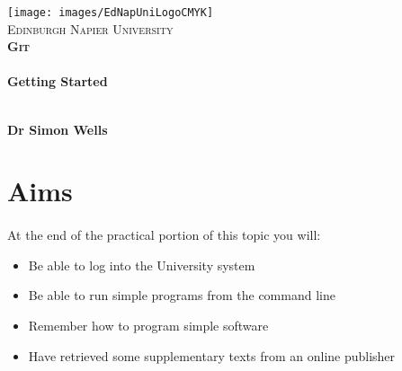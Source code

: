\documentclass[10pt, a4paper]{article}
\begin{document}

\begin{titlepage}
\vspace*{5cm}
\begin{center}
\texttt{[image: images/EdNapUniLogoCMYK]}~\\[1cm]

\textsc{\Large Edinburgh Napier University}\\[1.5cm]

\textsc{\LARGE \bfseries Git}\\[0.5cm]

\hrulefill \\[0.4cm]
{\huge \bfseries Getting Started \\[0.4cm] }
\hrulefill \\[1.5cm]

\begin{minipage}{0.4\textwidth}
\begin{flushleft} \large
\textbf{Dr Simon Wells} \\
\end{flushleft}
\end{minipage}

\vfill

\end{center}
\end{titlepage}




%

\section{Aims}
\paragraph{} At the end of the practical portion of this topic you will:

\begin{itemize}
\item Be able to log into the University system
\item Be able to run simple programs from the command line
\item Remember how to program simple software
\item Have retrieved some supplementary texts from an online publisher
\end{itemize}
\end{document}
